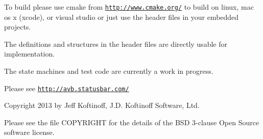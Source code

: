 To build please use cmake from \href{http://www.cmake.org/}{\tt http\+://www.\+cmake.\+org/} to build on linux, mac os x (xcode), or visual studio or just use the header files in your embedded projects.

The definitions and structures in the header files are directly usable for implementation.

The state machines and test code are currently a work in progress.

Please see \href{http://avb.statusbar.com/}{\tt http\+://avb.\+statusbar.\+com/}

Copyright 2013 by Jeff Koftinoff, J.\+D. Koftinoff Software, Ltd.

Please see the file C\+O\+P\+Y\+R\+I\+G\+HT for the details of the B\+SD 3-\/clause Open Source software license. 
